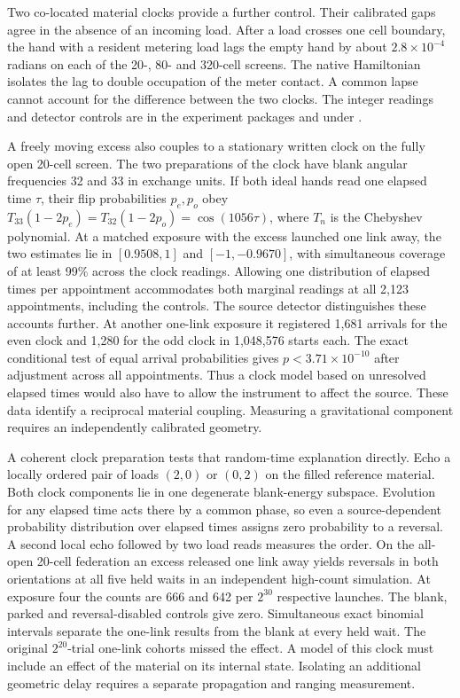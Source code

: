 \documentclass[11pt]{article}
\begin{document}
Two co-located material clocks provide a further control. Their
calibrated gaps agree in the absence of an incoming load. After a load
crosses one cell boundary, the hand with a resident metering load lags
the empty hand by about $2.8\times10^{-4}$ radians on each of the
20-, 80- and 320-cell screens. The native Hamiltonian isolates the lag
to double occupation of the meter contact. A common lapse cannot
account for the difference between the two clocks. The integer readings
and detector controls are in the experiment packages
 and 
under .

A freely moving excess also couples to a stationary written clock on
the fully open 20-cell screen. The two preparations of the clock have
blank angular frequencies 32 and 33 in exchange units. If both ideal
hands read one elapsed time \(\tau\), their flip probabilities \(p_e,p_o\)
obey \(T_{33}(1-2p_e)=T_{32}(1-2p_o)=\cos(1056\tau)\), where \(T_n\)
is the Chebyshev polynomial. At a matched exposure with the excess
launched one link away, the two estimates lie in \([0.9508,1]\) and
\([-1,-0.9670]\), with simultaneous coverage of at least 99\% across
the clock readings. Allowing one distribution of elapsed times per
appointment accommodates both marginal readings at all 2,123
appointments, including the controls. The source detector distinguishes
these accounts further. At another one-link exposure it registered
1,681 arrivals for the even clock and 1,280 for the odd clock in
1,048,576 starts each. The exact conditional test of equal arrival
probabilities gives \(p<3.71\times10^{-10}\) after adjustment across
all appointments. Thus a clock model based on unresolved elapsed times
would also have to allow the instrument to affect the source. These
data identify a reciprocal material coupling. Measuring a
gravitational component requires an independently calibrated geometry.

A coherent clock preparation tests that random-time explanation
directly. Echo a locally ordered pair of loads $(2,0)$ or $(0,2)$ on
the filled reference material. Both clock components lie in one
degenerate blank-energy subspace. Evolution for any elapsed time acts
there by a common phase, so even a source-dependent probability
distribution over elapsed times assigns zero probability to a
reversal. A second local echo followed by two load reads measures
the order. On the all-open 20-cell federation an excess released one
link away yields reversals in both orientations at all five held waits
in an independent high-count simulation. At exposure four the counts
are 666 and 642 per $2^{30}$ respective launches. The blank, parked
and reversal-disabled controls give zero. Simultaneous exact binomial
intervals separate the one-link results from the blank at every held
wait. The original $2^{20}$-trial one-link cohorts missed the effect.
A model of this clock must include an effect of the material on its
internal state. Isolating an additional geometric delay requires a
separate propagation and ranging measurement.
\end{document}

